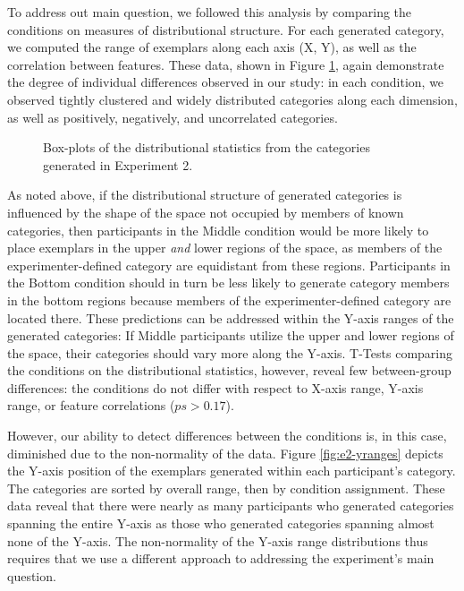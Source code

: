 \documentclass[12pt]{article}
\newcommand\inputpgf[2]{{
\let\pgfimageWithoutPath\pgfimage
\renewcommand{\pgfimage}[2][]{\pgfimageWithoutPath[##1]{#1/##2}}

}}
\begin{document}
\begin{flushleft}
To address out main question, we followed this analysis by comparing the conditions on measures of distributional structure. For each generated category, we computed the range of exemplars along each axis (X, Y), as well as the correlation between features. These data, shown in Figure \ref{fig:e2-statsboxes}, again demonstrate the degree of individual differences observed in our study: in each condition, we observed tightly clustered and widely distributed categories along each dimension, as well as positively, negatively, and uncorrelated categories. 

\begin{figure}
    \begin{center}
    \inputpgf{figs/}{e2-statsboxes.pgf}
    \caption{Box-plots of the distributional statistics from the categories generated in Experiment 2. }
    \label{fig:e2-statsboxes}
    \end{center}
\end{figure}


As noted above, if the distributional structure of generated categories is influenced by the shape of the space not occupied by members of known categories, then participants in the Middle condition would be more likely to place exemplars in the upper {\em and} lower regions of the space, as members of the experimenter-defined category are equidistant from these regions. Participants in the Bottom condition should in turn be less likely to generate category members in the bottom regions because members of the experimenter-defined category are located there. These predictions can be addressed within the Y-axis ranges of the generated categories: If Middle participants utilize the upper and lower regions of the space, their categories should vary more along the Y-axis. T-Tests comparing the conditions on the distributional statistics, however, reveal few between-group differences: the conditions do not differ with respect to X-axis range, Y-axis range, or feature correlations ($ps>0.17$).

However, our ability to detect differences between the conditions is, in this case, diminished due to the non-normality of the data. Figure \ref{fig:e2-yranges} depicts the Y-axis position of the exemplars generated within each participant's category. The categories are sorted by overall range, then by condition assignment. These data reveal that there were nearly as many participants who generated categories spanning the entire Y-axis as those who generated categories spanning almost none of the Y-axis. The non-normality of the Y-axis range distributions thus requires that we use a different approach to addressing the experiment's main question.


\end{flushleft}
\end{document}
